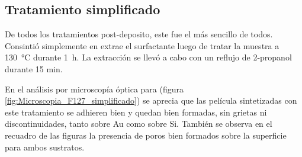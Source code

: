 	\subsection{Tratamiento simplificado}

		De todos los tratamientos post-deposito, este fue el más sencillo de todos. Consintió simplemente en extrae el surfactante luego de tratar la muestra a \SI{130}{\celsius} durante \SI{1}{\hour}. La extracción se llevó a cabo con un reflujo de 2-propanol durante 15 min. 
		
		En el análisis por microscopía óptica para \pdmF\space (figura \ref{fig:Microscopia_F127_simplificado}) se aprecia que las película sintetizadas con este tratamiento se adhieren bien y quedan bien formadas, sin grietas ni discontinuidades, tanto sobre Au como sobre Si. También se observa en el recuadro de las figuras  la presencia de poros bien formados sobre la superficie para ambos sustratos.
			
